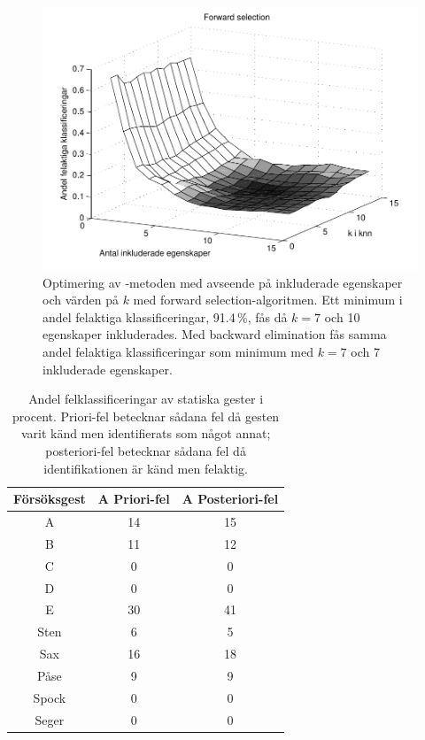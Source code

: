 \documentclass[../rapport_MVEX01-11-05]{subfiles}
\begin{document}
\begin{figure}[tbp]
    \begin{center}
        \includegraphics[width=0.5\columnwidth,clip=true]{bilder/fwd_sel}
    \end{center}
    \caption{Optimering av \knn-metoden med avseende på inkluderade egenskaper
och värden på $k$ med forward selection-algoritmen. Ett minimum i
andel felaktiga klassificeringar, 91.4\,\%, fås då
$k=7$ och 10 egenskaper inkluderades. Med backward elimination fås
samma andel felaktiga klassificeringar som minimum med $k=7$ och 7 inkluderade egenskaper.}
    \label{fig:knn-optimering}
\end{figure}



\begin{table}[tbp]
	\centering
	\caption{Andel felklassificeringar av statiska gester i procent. Priori-fel
	betecknar sådana fel då gesten varit känd men identifierats
	som något annat; posteriori-fel betecknar sådana fel då
	identifikationen är känd men felaktig. }
	\smallskip
	\label{tab:prestanda}
	\begin{tabular}{c c c}
		\toprule 
		Försöksgest & A Priori-fel & A Posteriori-fel \\
		\midrule 
		A & 14&15 \\
		B & 11&12 \\
		C & 0& 0\\
		D & 0& 0\\
		E & 30& 41\\
		Sten & 6& 5\\
		Sax & 16& 18\\
		Påse & 9& 9\\
		Spock & 0& 0\\
		Seger & 0& 0\\
		\bottomrule 
	\end{tabular}
\end{table}
\end{document}
